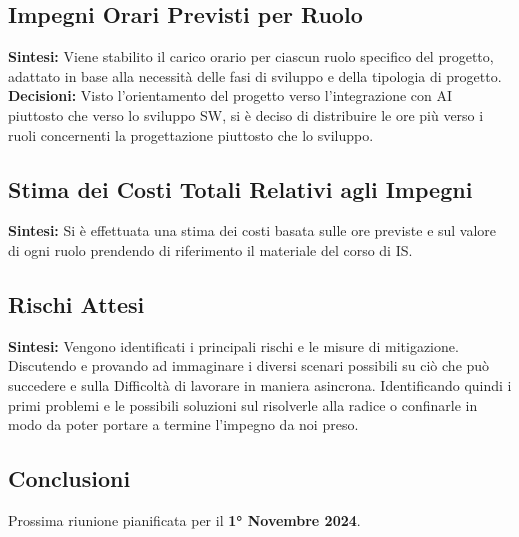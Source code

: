 \documentclass{article}
\begin{document}
\subsection{Impegni Orari Previsti per Ruolo}
\textbf{Sintesi:} Viene stabilito il carico orario per ciascun ruolo specifico del progetto, adattato in base alla necessità delle fasi di sviluppo e della tipologia di progetto. \\
\textbf{Decisioni:} Visto l'orientamento del progetto verso l'integrazione con AI piuttosto che verso lo sviluppo SW, si è deciso di distribuire le ore più verso i ruoli concernenti la progettazione piuttosto che lo sviluppo.

\subsection{Stima dei Costi Totali Relativi agli Impegni}
\textbf{Sintesi:} Si è effettuata una stima dei costi basata sulle ore previste e sul valore di ogni ruolo prendendo di riferimento il materiale del corso di IS.

\subsection{Rischi Attesi}
\textbf{Sintesi:} Vengono identificati i principali rischi e le misure di mitigazione. Discutendo e provando ad immaginare i diversi scenari possibili su ciò che può succedere e sulla Difficoltà di lavorare in maniera asincrona.
Identificando quindi i primi problemi e le possibili soluzioni sul risolverle alla radice o confinarle in modo da poter portare a termine l'impegno da noi preso.

\subsection*{Conclusioni}
Prossima riunione pianificata per il \textbf{1° Novembre 2024}.
\end{document}
